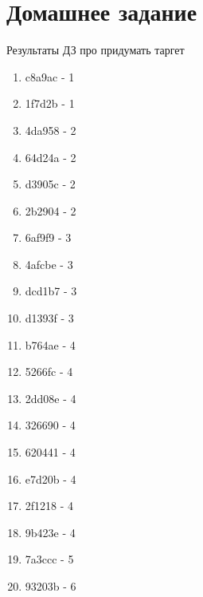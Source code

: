 \documentclass[14pt, fleqn, xcolor={dvipsnames, table}]{beamer}
\begin{document}
\section{Домашнее задание}



\begin{frame}{Результаты ДЗ про придумать таргет}
\tiny
\begin{center}
\begin{enumerate}
\item c8a9ac - 1
\item 1f7d2b - 1
\item 4da958 - 2
\item 64d24a - 2
\item d3905c - 2
\item 2b2904 - 2
\item 6af9f9 - 3
\item 4afcbe - 3
\item dcd1b7 - 3
\item d1393f - 3
\item b764ae - 4
\item 5266fc - 4
\item 2dd08e - 4
\item 326690 - 4
\item 620441 - 4
\item e7d20b - 4
\item 2f1218 - 4
\item 9b423e - 4
\item 7a3ccc - 5
\item 93203b - 6
\end{enumerate}
\end{center}
\end{frame}
\end{document}

